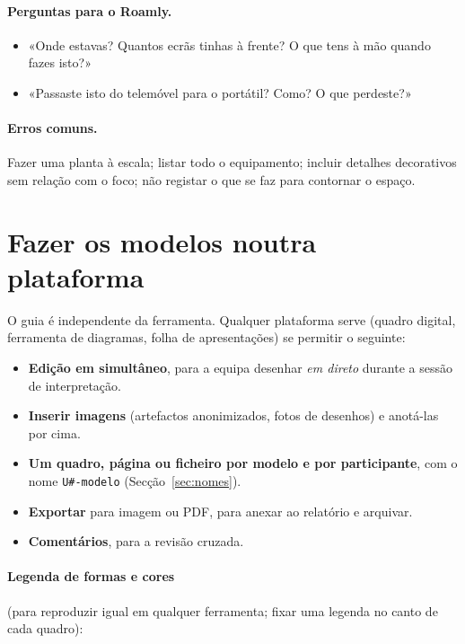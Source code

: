 \documentclass[11pt,a4paper]{article}
\begin{document}
\paragraph{Perguntas para o Roamly.}
\begin{itemize}
  \item «Onde estavas? Quantos ecrãs tinhas à frente? O que tens à mão quando fazes isto?»
  \item «Passaste isto do telemóvel para o portátil? Como? O que perdeste?»
\end{itemize}

\paragraph{Erros comuns.} Fazer uma planta à escala; listar todo o equipamento; incluir detalhes decorativos sem relação com o foco; não registar o que se faz para contornar o espaço.

\section{Fazer os modelos noutra plataforma}
\label{sec:plataforma}

O guia é independente da ferramenta. Qualquer plataforma serve (quadro digital, ferramenta de diagramas, folha de apresentações) se permitir o seguinte:

\begin{itemize}
  \item \textbf{Edição em simultâneo}, para a equipa desenhar \emph{em direto} durante a sessão de interpretação.
  \item \textbf{Inserir imagens} (artefactos anonimizados, fotos de desenhos) e anotá-las por cima.
  \item \textbf{Um quadro, página ou ficheiro por modelo e por participante}, com o nome \texttt{U\#-modelo} (Secção~\ref{sec:nomes}).
  \item \textbf{Exportar} para imagem ou PDF, para anexar ao relatório e arquivar.
  \item \textbf{Comentários}, para a revisão cruzada.
\end{itemize}

\paragraph{Legenda de formas e cores} (para reproduzir igual em qualquer ferramenta; fixar uma legenda no canto de cada quadro):
\end{document}
